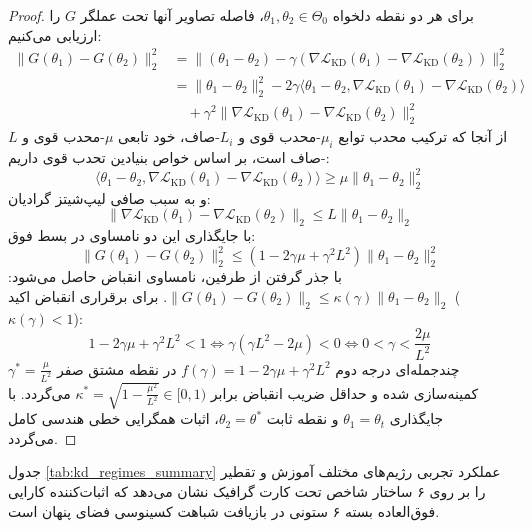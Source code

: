 \documentclass[12pt,a4paper]{report}
\theoremstyle{definition}
\begin{document}
\begin{proof}
برای هر دو نقطه دلخواه $\theta_1, \theta_2 \in \Theta_0$، فاصله تصاویر آنها تحت عملگر $G$ را ارزیابی می‌کنیم:
\begin{align}
    \|G(\theta_1) - G(\theta_2)\|_2^2 &= \|(\theta_1 - \theta_2) - \gamma (\nabla \mathcal{L}_{\text{KD}}(\theta_1) - \nabla \mathcal{L}_{\text{KD}}(\theta_2))\|_2^2 \nonumber \\
    &= \|\theta_1 - \theta_2\|_2^2 - 2 \gamma \langle \theta_1 - \theta_2, \nabla \mathcal{L}_{\text{KD}}(\theta_1) - \nabla \mathcal{L}_{\text{KD}}(\theta_2) \rangle \nonumber \\
    &\quad + \gamma^2 \|\nabla \mathcal{L}_{\text{KD}}(\theta_1) - \nabla \mathcal{L}_{\text{KD}}(\theta_2)\|_2^2
\end{align}
از آنجا که ترکیب محدب توابع $\mu_i$-محدب قوی و $L_i$-صاف، خود تابعی $\mu$-محدب قوی و $L$-صاف است، بر اساس خواص بنیادین تحدب قوی داریم:
\begin{equation}
    \langle \theta_1 - \theta_2, \nabla \mathcal{L}_{\text{KD}}(\theta_1) - \nabla \mathcal{L}_{\text{KD}}(\theta_2) \rangle \ge \mu \|\theta_1 - \theta_2\|_2^2
\end{equation}
و به سبب صافی لیپ‌شیتز گرادیان:
\begin{equation}
    \|\nabla \mathcal{L}_{\text{KD}}(\theta_1) - \nabla \mathcal{L}_{\text{KD}}(\theta_2)\|_2 \le L \|\theta_1 - \theta_2\|_2
\end{equation}
با جایگذاری این دو نامساوی در بسط فوق:
\begin{equation}
    \|G(\theta_1) - G(\theta_2)\|_2^2 \le \left(1 - 2 \gamma \mu + \gamma^2 L^2\right) \|\theta_1 - \theta_2\|_2^2
\end{equation}
با جذر گرفتن از طرفین، نامساوی انقباض حاصل می‌شود: $\|G(\theta_1) - G(\theta_2)\|_2 \le \kappa(\gamma) \|\theta_1 - \theta_2\|_2$.
برای برقراری انقباض اکید ($\kappa(\gamma) < 1$):
\begin{equation}
    1 - 2 \gamma \mu + \gamma^2 L^2 < 1 \iff \gamma (\gamma L^2 - 2 \mu) < 0 \iff 0 < \gamma < \frac{2\mu}{L^2}
\end{equation}
چندجمله‌ای درجه دوم $f(\gamma) = 1 - 2\gamma\mu + \gamma^2 L^2$ در نقطه مشتق صفر $\gamma^* = \frac{\mu}{L^2}$ کمینه‌سازی شده و حداقل ضریب انقباض برابر $\kappa^* = \sqrt{1 - \frac{\mu^2}{L^2}} \in [0, 1)$ می‌گردد. با جایگذاری $\theta_1 = \theta_t$ و نقطه ثابت $\theta_2 = \theta^*$، اثبات همگرایی خطی هندسی کامل می‌گردد.
\end{proof}

جدول \ref{tab:kd_regimes_summary} عملکرد تجربی رژیم‌های مختلف آموزش و تقطیر را بر روی ۶ ساختار شاخص تحت کارت گرافیک  نشان می‌دهد که اثبات‌کننده کارایی فوق‌العاده بسته ۶ ستونی در بازیافت شباهت کسینوسی فضای پنهان است.
\end{document}
